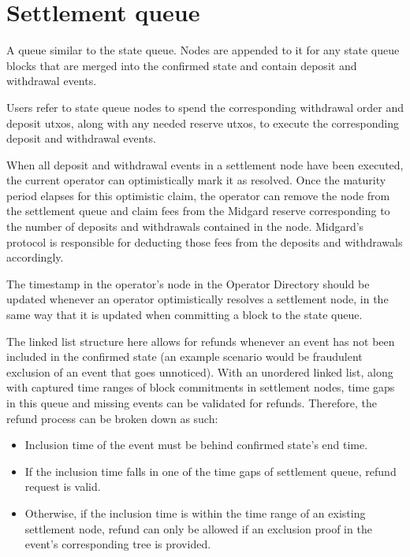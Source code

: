 \documentclass[../midgard.tex]{subfiles}
\begin{document}
\section{Settlement queue}
\label{h:settlement-queue}

A queue similar to the state queue.
Nodes are appended to it for any state queue blocks that are merged into the confirmed state and contain deposit and withdrawal events.

Users refer to state queue nodes to spend the corresponding withdrawal order and deposit utxos, along with any needed reserve utxos, to execute the corresponding deposit and withdrawal events.

When all deposit and withdrawal events in a settlement node have been executed, the current operator can optimistically mark it as resolved.
Once the maturity period elapses for this optimistic claim, the operator can remove the node from the settlement queue and claim fees from the Midgard reserve corresponding to the number of deposits and withdrawals contained in the node.
Midgard's protocol is responsible for deducting those fees from the deposits and withdrawals accordingly.

The timestamp in the operator's node in the Operator Directory should be updated whenever an operator optimistically resolves a settlement node, in the same way that it is updated when committing a block to the state queue.

\todo


The linked list structure here allows for refunds whenever an event has not been included in the confirmed state (an example scenario would be fraudulent exclusion of an event that goes unnoticed). With an unordered linked list, along with captured time ranges of block commitments in settlement nodes, time gaps in this queue and missing events can be validated for refunds. Therefore, the refund process can be broken down as such:
\begin{itemize}
  \item Inclusion time of the event must be behind confirmed state's end time.
  \item If the inclusion time falls in one of the time gaps of settlement queue, refund request is valid.
  \item Otherwise, if the inclusion time is within the time range of an existing settlement node, refund can only be allowed if an exclusion proof in the event's corresponding tree is provided.
\end{itemize}
\end{document}
